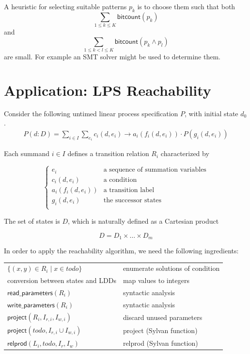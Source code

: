 \documentclass{article}
\newcommand{\var}[1]{\ensuremath{\textit{#1}}}
\begin{document}
\vspace{0.5cm}
\noindent
A heuristic for selecting suitable patterns $p_k$ is to choose them such that both
\[
\sum\limits_{1 \leq k \leq K} \textsf{bitcount}(p_k)
\]
and
\[
\sum\limits_{1 \leq k < l \leq K} \textsf{bitcount}(p_k \land p_l)
\]
are small. For example an SMT solver might be used to determine them.

\newpage
\section{Application: LPS Reachability}
Consider the following untimed linear process specification $P$, with initial state $d_0$.
\[
\begin{array}{l}
P(d: D)=
\sum\limits_{i\in I}\sum\limits_{e_i}c_i(d, e_i)\rightarrow a_i(f_i(d,e_i)) \cdot P(g_i(d,e_i))
\end{array}
\]

\noindent
Each summand $i \in I$ defines a transition relation $R_i$ characterized by

\[
\left\{
\begin{array}{ll}
    e_i & \text{a sequence of summation variables} \\
    c_i(d, e_i) & \text{a condition} \\
    a_i(f_i(d,e_i)) & \text{a transition label} \\
    g_i(d,e_i) & \text{the successor states} \\
\end{array}
\right.
\]

\vspace{0.5cm}
\noindent
The set of states is $D$, which is naturally defined as a
Cartesian product

\[
D = D_1 \times \ldots \times D_m
\]

In order to apply the reachability algorithm, we need the following ingredients:

\begin{center}
\label{table:ingredients}
\begin{tabular}{ |l|l| }
\hline
$\{ (x,y) \in R_i \mid x \in todo \}$ & enumerate solutions of condition \\
conversion between states and LDDs & map values to integers \\
$\textsf{read\_parameters}(R_i)$ & syntactic analysis \\
$\textsf{write\_parameters}(R_i)$ & syntactic analysis \\
$\textsf{project}(R_i, I_{r,i}, I_{w,i})$ & discard unused parameters \\
$\textsf{project}(\var{todo}, I_{r,i} \cup I_{w,i})$ & \textsf{project} (Sylvan function) \\
$\textsf{relprod}(L_i, \var{todo}, I_r, I_w)$ & \textsf{relprod} (Sylvan function) \\
\hline
\end{tabular}
\end{center}
\end{document}
